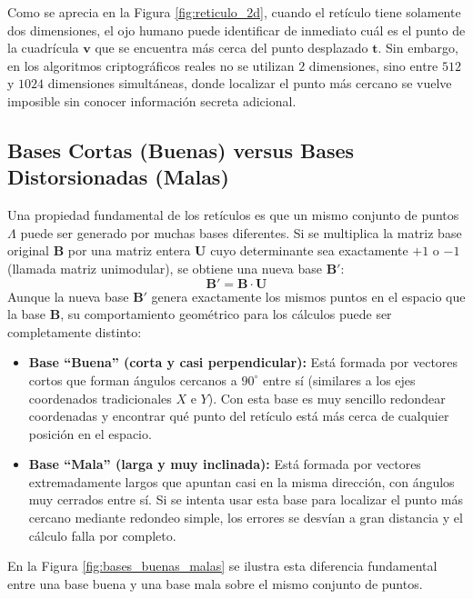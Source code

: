Como se aprecia en la Figura \ref{fig:reticulo_2d}, cuando el retículo tiene solamente dos dimensiones, el ojo humano puede identificar de inmediato cuál es el punto de la cuadrícula $\mathbf{v}$ que se encuentra más cerca del punto desplazado $\mathbf{t}$. Sin embargo, en los algoritmos criptográficos reales no se utilizan $2$ dimensiones, sino entre $512$ y $1024$ dimensiones simultáneas, donde localizar el punto más cercano se vuelve imposible sin conocer información secreta adicional.

\subsection{Bases Cortas (Buenas) versus Bases Distorsionadas (Malas)}

Una propiedad fundamental de los retículos es que un mismo conjunto de puntos $\Lambda$ puede ser generado por muchas bases diferentes. Si se multiplica la matriz base original $\mathbf{B}$ por una matriz entera $\mathbf{U}$ cuyo determinante sea exactamente $+1$ o $-1$ (llamada matriz unimodular), se obtiene una nueva base $\mathbf{B}'$:
\begin{equation}
	\mathbf{B}' = \mathbf{B} \cdot \mathbf{U}
\end{equation}
Aunque la nueva base $\mathbf{B}'$ genera exactamente los mismos puntos en el espacio que la base $\mathbf{B}$, su comportamiento geométrico para los cálculos puede ser completamente distinto:

\begin{itemize}
	\item \textbf{Base ``Buena'' (corta y casi perpendicular):} Está formada por vectores cortos que forman ángulos cercanos a $90^\circ$ entre sí (similares a los ejes coordenados tradicionales $X$ e $Y$). Con esta base es muy sencillo redondear coordenadas y encontrar qué punto del retículo está más cerca de cualquier posición en el espacio.

	\item \textbf{Base ``Mala'' (larga y muy inclinada):} Está formada por vectores extremadamente largos que apuntan casi en la misma dirección, con ángulos muy cerrados entre sí. Si se intenta usar esta base para localizar el punto más cercano mediante redondeo simple, los errores se desvían a gran distancia y el cálculo falla por completo.
\end{itemize}

En la Figura \ref{fig:bases_buenas_malas} se ilustra esta diferencia fundamental entre una base buena y una base mala sobre el mismo conjunto de puntos.

